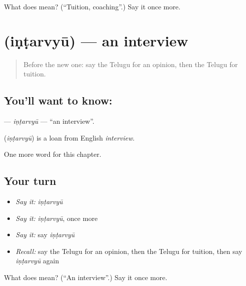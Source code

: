 \begin{tcolorbox}[breakable,colback=teal!4,colframe=teal!35!black,title={Before you move on}]
What does  mean? (\textquotedblleft{}Tuition, coaching\textquotedblright{}.) Say it once more.
\end{tcolorbox}
\section[\texorpdfstring{\te{ఇంటర్వ్యూ} (iṇṭarvyū)}{ఇంటర్వ్యూ (iṇṭarvyū)}]{ (iṇṭarvyū) — an interview}

\label{lesson:TE-C198-intarvyu}



\begin{quote}
Before the new one: say the Telugu for an opinion, then the Telugu for tuition.
\end{quote}

\subsection*{You'll want to know: }
\textbf{} — \emph{iṇṭarvyū} — \textquotedblleft{}an interview\textquotedblright{}.

\begin{cousinweb}
\textbf{} (\emph{iṇṭarvyū}) is a loan from English \emph{interview}.
\end{cousinweb}

\begin{grammarlens}[title={What you've built}]
One more word for this chapter.
\end{grammarlens}

\subsection*{Your turn}
\begin{itemize}
\raggedright
  \item \emph{Say it:} \emph{iṇṭarvyū}
  \item \emph{Say it:} \emph{iṇṭarvyū}, once more
  \item \emph{Say it:} say \emph{iṇṭarvyū}
  \item \emph{Recall:} say the Telugu for an opinion, then the Telugu for tuition, then say \emph{iṇṭarvyū} again
\end{itemize}

\begin{tcolorbox}[breakable,colback=teal!4,colframe=teal!35!black,title={Before you move on}]
What does  mean? (\textquotedblleft{}An interview\textquotedblright{}.) Say it once more.
\end{tcolorbox}
